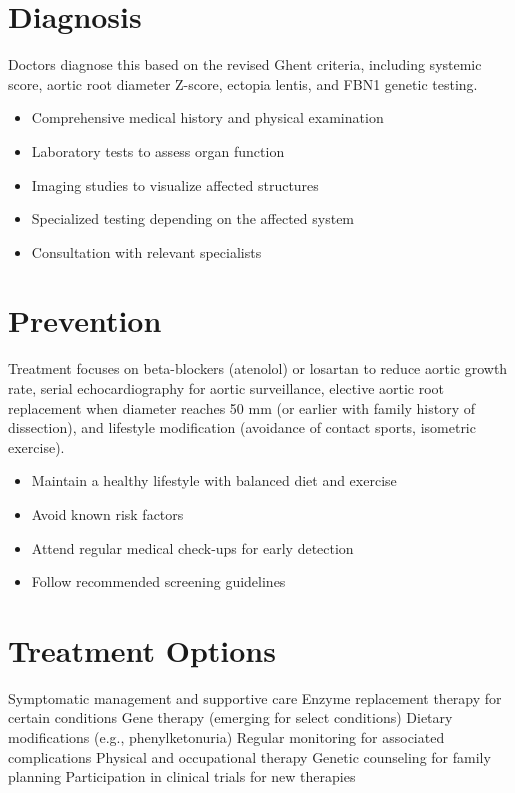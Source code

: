\section{Diagnosis}
Doctors diagnose this based on the revised Ghent criteria, including systemic score, aortic root diameter Z-score, ectopia lentis, and FBN1 genetic testing.

\begin{itemize}[noitemsep]
  \item Comprehensive medical history and physical examination
  \item Laboratory tests to assess organ function
  \item Imaging studies to visualize affected structures
  \item Specialized testing depending on the affected system
  \item Consultation with relevant specialists
\end{itemize}
\section{Prevention}
Treatment focuses on beta-blockers (atenolol) or losartan to reduce aortic growth rate, serial echocardiography for aortic surveillance, elective aortic root replacement when diameter reaches 50 mm (or earlier with family history of dissection), and lifestyle modification (avoidance of contact sports, isometric exercise).

\begin{itemize}[noitemsep]
  \item Maintain a healthy lifestyle with balanced diet and exercise
  \item Avoid known risk factors
  \item Attend regular medical check-ups for early detection
  \item Follow recommended screening guidelines
\end{itemize}
\section{Treatment Options}
Symptomatic management and supportive care Enzyme replacement therapy for certain conditions Gene therapy (emerging for select conditions) Dietary modifications (e.g., phenylketonuria) Regular monitoring for associated complications Physical and occupational therapy Genetic counseling for family planning Participation in clinical trials for new therapies


